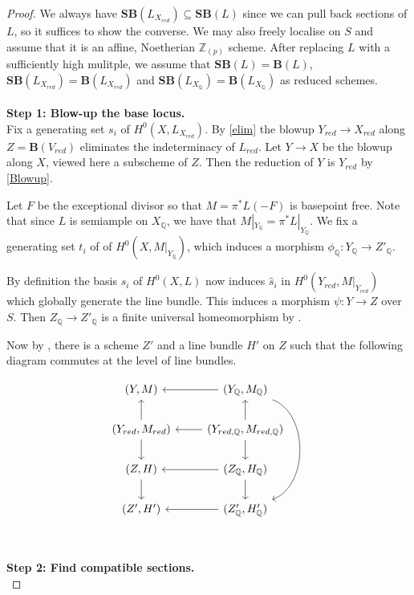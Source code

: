 \documentclass[a4paper,12pt]{book}
\newcommand{\SB}{\mathbf{SB}}
\newcommand{\BB}{\mathbf{B}}
\begin{document}
\begin{proof}
	
	We always have $\SB(L_{X_{red}}) \subseteq \SB(L)$ since we can pull back sections of $L$, so it suffices to show the converse. We may also freely localise on $S$ and assume that it is an affine, Noetherian $\mathbb{Z}_{(p)}$ scheme. After replacing $L$ with a sufficiently high mulitple, we assume that $\SB(L)=\BB(L)$, $\SB(L_{X_{red}})=\BB(L_{X_{red}})$ and $\SB(L_{X_{\mathbb{Q}}})=\BB(L_{X_{\mathbb{Q}}})$ as reduced schemes.\\
	\\
	\textbf{Step 1: Blow-up the base locus.}\\
	
	Fix a generating set $s_{i}$ of $H^{0}(X,L_{X_{red}})$.	By \autoref{elim} the blowup $Y_{red} \to X_{red}$ along $Z=\BB(V_{red})$ eliminates the indeterminacy of $L_{red}$. Let $Y \to X$ be the blowup along $X$, viewed here a subscheme of $Z$. Then the reduction of $Y$ is $Y_{red}$ by \autoref{Blowup}.
	
	Let $F$ be the exceptional divisor so that $M = \pi^{*}L(-F)$ is basepoint free. Note that since $L$ is semiample on $X_{\mathbb{Q}}$, we have that $M|_{Y_{\mathbb{Q}}}=\pi^{*}L|_{Y_{\mathbb{Q}}}$. We fix a generating set $t_{i}$ of of $H^{0}(X,M|_{Y_{\mathbb{Q}}})$, which induces a morphism $\phi_{\mathbb{Q}}\colon Y_{\mathbb{Q}} \to Z'_{\mathbb{Q}}$. 
	
	By definition the basis $s_{i}$ of $H^{0}(X,L)$ now induces $\hat{s}_{i}$ in $H^{0}(Y_{red},M|_{Y_{red}})$ which globally generate the line bundle. This induces a morphism $\psi: Y \to Z$ over $S$. Then $Z_{\mathbb{Q}} \to Z'_{\mathbb{Q}}$ is a finite universal homeomorphism by \cite[Tag 02OG]{stacks-project}. 
	
	Now by \cite[Theorem 1.7, Corollary 4.20 and Lemma 2.20]{witaszek2020keel}, there is a scheme $Z'$ and a line bundle $H'$ on $Z$ such that the following diagram commutes at the level of line bundles.
	
	\[\begin{tikzcd}
	{(Y,M)}                                 & {(Y_{\mathbb{Q}},M_{\mathbb{Q}})} \arrow[ddd, bend left=70] \arrow[l]     \\
	{(Y_{red},M_{red})} \arrow[d] \arrow[u] & {(Y_{red, \mathbb{Q}},M_{red, \mathbb{Q}})} \arrow[d] \arrow[u] \arrow[l] \\
	{(Z,H)} \arrow[d]                       & {(Z_{\mathbb{Q}},H_{\mathbb{Q}})} \arrow[l] \arrow[d]                    \\
	{(Z',H')}                               & {(Z'_{\mathbb{Q}},H'_{\mathbb{Q}})} \arrow[l]                            
	\end{tikzcd}\]\\
	\\
	\textbf{Step 2: Find compatible sections.}\\
	

\end{proof}
\end{document}
